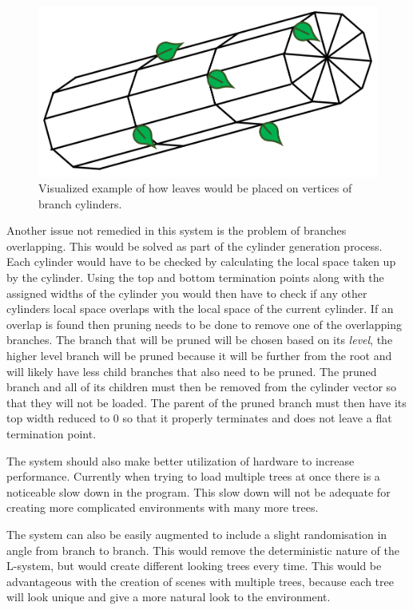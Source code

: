 \documentclass[final]{cmpreport}
\begin{document}
\begin{figure}[ht]
    \includegraphics[scale=0.4]{leaf-placement.PNG} 
    \centering
    \captionsetup{justification=centering}
    \caption{Visualized example of how leaves would be placed on vertices of branch cylinders.}
    \label{fig:leaf-placement}
\end{figure}

Another issue not remedied in this system is the problem of branches overlapping. This would be solved 
as part of the cylinder generation process. Each cylinder would have to be checked by calculating 
the local space taken up by the cylinder. Using the top and bottom termination points along with the 
assigned widths of the cylinder you would then have to check if any other cylinders local space 
overlaps with the local space of the current cylinder. If an overlap is found then pruning needs to 
be done to remove one of the overlapping branches. The branch that will be pruned will be chosen 
based on its \emph{level}, the higher level branch will be pruned because it will be further from 
the root and will likely have less child branches that also need to be pruned. The pruned branch 
and all of its children must then be removed from the cylinder vector so that they will not be 
loaded. The parent of the pruned branch must then have its top width reduced to 0 so that it 
properly terminates and does not leave a flat termination point.

The system should also make better utilization of hardware to increase performance. Currently when 
trying to load multiple trees at once there is a noticeable slow down in the program. This slow down 
will not be adequate for creating more complicated environments with many more trees.

The system can also be easily augmented to include a slight randomisation in angle from branch to branch.
This would remove the deterministic nature of the L-system, but would create different looking trees 
every time. This would be advantageous with the creation of scenes with multiple trees, because each tree will 
look unique and give a more natural look to the environment.
\end{document}
